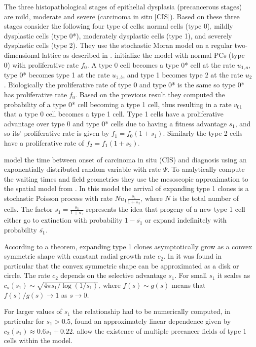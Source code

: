 \documentclass[\main/thesis.tex]{subfiles}
\begin{document}
The three histopathological stages of epithelial dysplasia (precancerous stages) are mild, moderate and severe (carcinoma in situ [CIS]). Based on these three stages \textcite{Ryser} consider the following four type of cells: normal cells (type 0), mildly dysplastic cells (type 0*), moderately dysplastic cells (type 1), and severely dysplastic cells (type 2). They use the stochastic Moran model on a regular two-dimensional lattice as described in \textcite{Foo}. \textcite{Ryser} initialize the model with normal PCs (type 0) with proliferative rate $f_0$. A type 0 cell becomes a type 0* cell at the rate $u_{1, a}$, type 0* becomes type 1 at the rate $u_{1, b}$, and type 1 becomes type 2 at the rate $u_2$. Biologically the proliferative rate of type 0 and type 0* is the same so type 0* has proliferative rate $f_0$. Based on the previous result they computed the probability of a type 0* cell becoming a type 1 cell, thus resulting in a rate $v_{01}$ that a type 0 cell becomes a type 1 cell. Type 1 cells have a proliferative advantage over type 0 and type 0* cells due to having a fitness advantage $s_1$, and so its' proliferative rate is given by $f_1 = f_0(1 + s_1)$. Similarly the type 2 cells have a proliferative rate of $f_2 = f_1(1 + s_2)$. 

\textcite{Ryser} model the time between onset of carcinoma in situ (CIS) and diagnosis using an exponentially distributed random variable with rate $\Psi$. To analytically compute the waiting times and field geometries they use the mesoscopic approximation to the spatial model from \textcite{Foo}. In this model the arrival of expanding type 1 clones is a stochastic Poisson process with rate $Nu_1\frac{s_1}{1+s_1}$, where $N$ is the total number of cells. The factor $\overline{s_1}=\frac{s_1}{1+s_1}$ represents the idea that progeny of a new type 1 cell either go to extinction with probability $1-\overline{s_1}$ or expand indefinitely with probability $\overline{s_1}$. 

According to a theorem, expanding type 1 clones asymptotically grow as a convex symmetric shape with constant radial growth rate $c_2$. In \textcite{Foo} it was found in particular that the convex symmetric shape can be approximated as a disk or circle. The rate $c_2$ depends on the selective advantage $s_1$. For small $s_1$ it scales as $c_s(s_1) \sim \sqrt{4\pi s_1 / \log{(1/s_1)}}$, where $f(s) \sim g(s)$ means that $f(s)/g(s) \rightarrow 1$ as $s \rightarrow 0$. 

For larger values of $s_1$ the relationship had to be numerically computed, in particular for $s_1 > 0.5$, \textcite{Ryser} found an approximately linear dependence given by $c_2(s_1) \approx 0.6s_1 + 0.22$. \textcite{Ryser} allow the existence of multiple precancer fields of type 1 cells within the model. 
\end{document}
